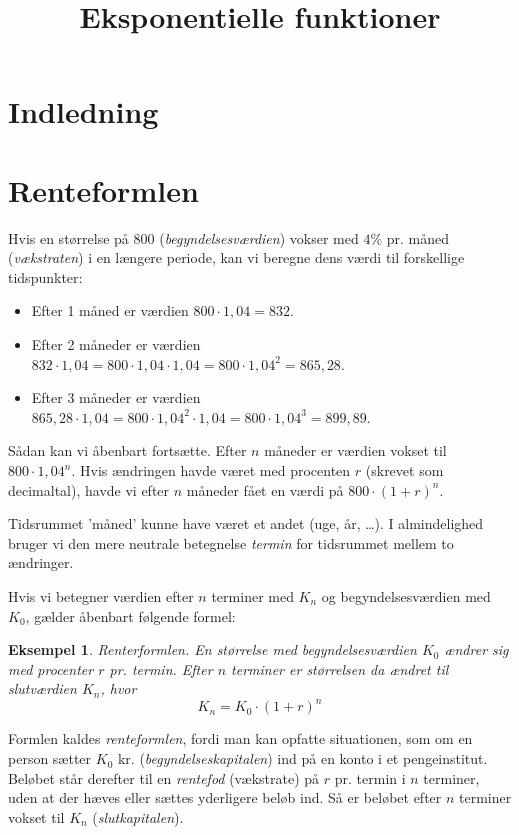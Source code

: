 \documentclass[12pt,oneside,a4paper]{article}
\title{Eksponentielle funktioner}
\newtheorem{eks}[thm]{Eksempel}
\begin{document}
\maketitle

\section{Indledning}
\section{Renteformlen}
Hvis en størrelse på 800 ({\em begyndelsesværdien}) vokser med $4\%$ pr. måned
({\em vækstraten}) i en længere periode, kan vi beregne dens værdi til
forskellige tidspunkter:
\begin{itemize}
    \item Efter 1 måned er værdien $800\cdot 1,04 = 832$.
    \item Efter 2 måneder er værdien $832\cdot 1,04 = 800 \cdot 1,04 \cdot 1,04
        = 800 \cdot 1,04^2 = 865,28$.
    \item Efter 3 måneder er værdien $865,28\cdot 1,04 = 800 \cdot 1,04^2 \cdot
        1,04 = 800 \cdot 1,04^3 = 899,89$.
\end{itemize}
Sådan kan vi åbenbart fortsætte. Efter $n$ måneder er værdien vokset til
$800\cdot 1,04^n$. Hvis ændringen havde været med procenten $r$ (skrevet som
decimaltal), havde vi efter $n$ måneder fået en værdi på $800\cdot(1+r)^n$.

Tidsrummet 'måned' kunne have været et andet (uge, år, \ldots). I almindelighed
bruger vi den mere neutrale betegnelse {\em termin} for tidsrummet mellem to
ændringer.

Hvis vi betegner værdien efter $n$ terminer med $K_n$ og begyndelsesværdien med
$K_0$, gælder åbenbart følgende formel:
\begin{eks}
    {\em Renterformlen}. En størrelse med begyndelsesværdien $K_0$ ændrer sig
    med procenter $r$ pr. termin. Efter $n$ terminer er størrelsen da ændret
    til slutværdien $K_n$, hvor
    $$
    K_n = K_0 \cdot (1+r)^n
    $$
\end{eks}
Formlen kaldes {\em renteformlen}, fordi man kan opfatte situationen, som om en
person sætter $K_0$ kr. ({\em begyndelseskapitalen}) ind på en konto i et
pengeinstitut. Beløbet står derefter til en {\em rentefod} (vækstrate) på $r$
pr. termin i $n$ terminer, uden at der hæves eller sættes yderligere beløb ind.
Så er beløbet efter $n$ terminer vokset til $K_n$ ({\em slutkapitalen}).
\end{document}
